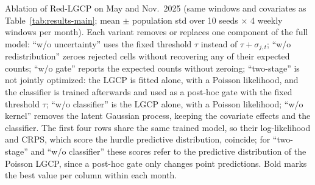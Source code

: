 \begin{table}[t]
\caption{Ablation of Red-LGCP on May and Nov.\ 2025 (same windows and covariates as Table~\ref{tab:results-main}; mean $\pm$ population std over 10 seeds $\times$ 4 weekly windows per month). Each variant removes or replaces one component of the full model: ``w/o uncertainty'' uses the fixed threshold $\tau$ instead of $\tau+\sigma_{j,t}$; ``w/o redistribution'' zeroes rejected cells without recovering any of their expected counts; ``w/o gate'' reports the expected counts without zeroing; ``two-stage'' is not jointly optimized: the LGCP is fitted alone, with a Poisson likelihood, and the classifier is trained afterwards and used as a post-hoc gate with the fixed threshold $\tau$; ``w/o classifier'' is the LGCP alone, with a Poisson likelihood; ``w/o kernel'' removes the latent Gaussian process, keeping the covariate effects and the classifier. The first four rows share the same trained model, so their log-likelihood and CRPS, which score the hurdle predictive distribution, coincide; for ``two-stage'' and ``w/o classifier'' these scores refer to the predictive distribution of the Poisson LGCP, since a post-hoc gate only changes point predictions. Bold marks the best value per column within each month.}
\label{tab:results-ablation}
\end{table}
